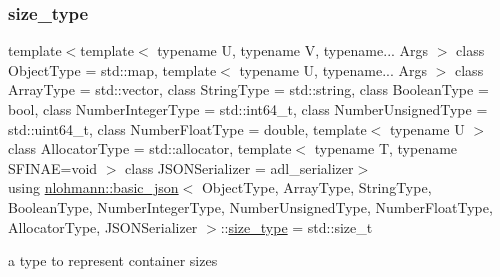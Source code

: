 \subsubsection{\texorpdfstring{size\_type}{size\_type}}
{\footnotesize\ttfamily template$<$template$<$ typename U, typename V, typename... Args $>$ class Object\+Type = std\+::map, template$<$ typename U, typename... Args $>$ class Array\+Type = std\+::vector, class String\+Type  = std\+::string, class Boolean\+Type  = bool, class Number\+Integer\+Type  = std\+::int64\+\_\+t, class Number\+Unsigned\+Type  = std\+::uint64\+\_\+t, class Number\+Float\+Type  = double, template$<$ typename U $>$ class Allocator\+Type = std\+::allocator, template$<$ typename T, typename S\+F\+I\+N\+A\+E=void $>$ class J\+S\+O\+N\+Serializer = adl\+\_\+serializer$>$ \\
using \mbox{\hyperlink{classnlohmann_1_1basic__json}{nlohmann\+::basic\+\_\+json}}$<$ Object\+Type, Array\+Type, String\+Type, Boolean\+Type, Number\+Integer\+Type, Number\+Unsigned\+Type, Number\+Float\+Type, Allocator\+Type, J\+S\+O\+N\+Serializer $>$\+::\mbox{\hyperlink{classnlohmann_1_1basic__json_a39f2cd0b58106097e0e67bf185cc519b}{size\+\_\+type}} =  std\+::size\+\_\+t}



a type to represent container sizes 

\mbox{\label{classnlohmann_1_1basic__json_a61f8566a1a85a424c7266fb531dca005}} 
